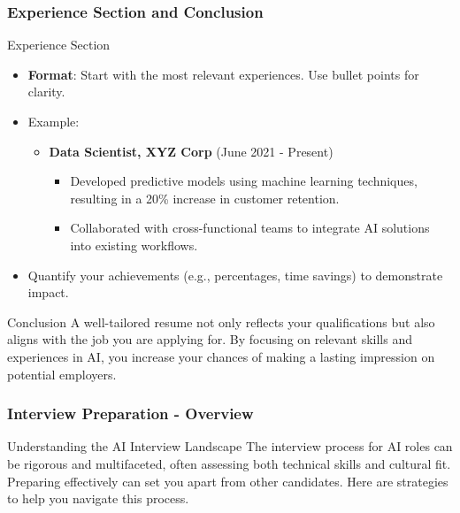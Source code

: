 \documentclass{beamer}
\begin{document}
\begin{frame}[fragile]
    \frametitle{Experience Section and Conclusion}
    \begin{block}{Experience Section}
        \begin{itemize}
            \item \textbf{Format}: Start with the most relevant experiences. Use bullet points for clarity.
            \item Example:
                \begin{itemize}
                    \item \textbf{Data Scientist, XYZ Corp} (June 2021 - Present)
                    \begin{itemize}
                        \item Developed predictive models using machine learning techniques, resulting in a 20\% increase in customer retention.
                        \item Collaborated with cross-functional teams to integrate AI solutions into existing workflows.
                    \end{itemize}
                \end{itemize}
            \item Quantify your achievements (e.g., percentages, time savings) to demonstrate impact.
        \end{itemize}
    \end{block}

    \begin{block}{Conclusion}
        A well-tailored resume not only reflects your qualifications but also aligns with the job you are applying for. By focusing on relevant skills and experiences in AI, you increase your chances of making a lasting impression on potential employers.
    \end{block}
\end{frame}

\begin{frame}[fragile]
    \frametitle{Interview Preparation - Overview}
    \begin{block}{Understanding the AI Interview Landscape}
        The interview process for AI roles can be rigorous and multifaceted, often assessing both technical skills and cultural fit. Preparing effectively can set you apart from other candidates. Here are strategies to help you navigate this process.
    \end{block}
\end{frame}
\end{document}
